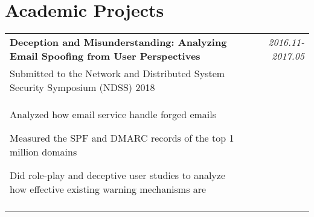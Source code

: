 \documentclass[a4paper,10pt]{article}
\begin{document}
\section{Academic Projects}
\begin{tabular}{p{13.5cm}p{0.5cm}r}

\textbf{Deception and Misunderstanding: Analyzing Email Spoofing from User Perspectives} && \emph{2016.11-2017.05} \\
\hspace{1em} Submitted to the Network and Distributed System Security Symposium  (NDSS) 2018 && \vspace{-0.5em} \\
\begin{compactitem}
\item Analyzed how email service handle forged emails
\item Measured the SPF and DMARC records of the top 1 million domains
\item Did role-play and deceptive user studies to analyze how effective existing warning mechanisms are
\end{compactitem}&&\vspace{-2.2em} \\
\multicolumn{3}{c}{} \\


\end{tabular}
\end{document}

